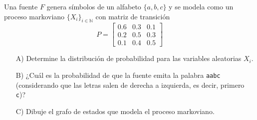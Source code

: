 
Una fuente $F$ genera símbolos de un alfabeto $\{a, b, c\}$ y se modela como un proceso markoviano $\{X_i\}_{i \in \mathbb{N}}$ con matriz de transición
\begin{equation*}
    P = \begin{bmatrix} 0\text{.}6 & 0\text{.}3 & 0\text{.}1 \\ 0\text{.}2 & 0\text{.}5 & 0\text{.}3 \\ 0\text{.}1 & 0\text{.}4 & 0\text{.}5 \end{bmatrix}
\end{equation*}

\begin{itemize}
    \item[A)] Determine la distribución de probabilidad para las variables aleatorias $X_i$.
    \item[B)] ¿Cuál es la probabilidad de que la fuente emita la palabra \texttt{aabc} (considerando que las letras salen de derecha a izquierda, es decir, primero \texttt{c})?
    \item[C)]  Dibuje el grafo de estados que modela el proceso markoviano.
\end{itemize}